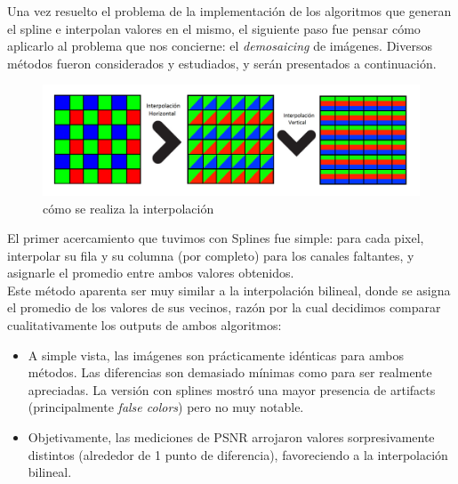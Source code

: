 \documentclass[a4paper]{article}
\begin{document}
Una vez resuelto el problema de la implementación de los algoritmos que generan el spline e interpolan valores en el mismo, el siguiente paso fue pensar c\'omo aplicarlo al problema que nos concierne: el \textit{demosaicing} de imágenes. Diversos métodos fueron considerados y estudiados, y serán presentados a continuación. \\
\pagebreak
\begin{figure}[h!]
	\caption{cómo se realiza la interpolación}
	\begin{center}
	    \includegraphics[scale=0.47]{imagenes/Splines/splines1.png}
	\end{center}
	\label{splines1}
\end{figure}

El primer acercamiento que tuvimos con Splines fue simple: para cada pixel, interpolar su fila y su columna (por completo) para los canales faltantes, y asignarle el promedio entre ambos valores obtenidos. \\
Este método aparenta ser muy similar a la interpolación bilineal, donde se asigna el promedio de los valores de sus vecinos, razón por la cual decidimos comparar cualitativamente los outputs de ambos algoritmos:
\begin{itemize}
\item A simple vista, las imágenes son prácticamente idénticas para ambos métodos. Las diferencias son demasiado mínimas como para ser realmente apreciadas. La versión con splines mostró una mayor presencia de artifacts (principalmente \textit{false colors}) pero no muy notable.
\item Objetivamente, las mediciones de PSNR arrojaron valores sorpresivamente distintos (alrededor de 1 punto de diferencia), favoreciendo a la interpolación bilineal.
\end{itemize}
\end{document}
